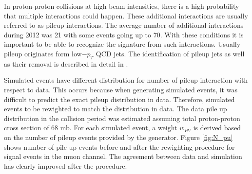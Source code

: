 In proton-proton collisions at high beam intensities, there is a high probability that multiple interactions could happen. These additional interactions are usually referred to as pileup interactions. The average number of additional interactions during 2012 was 21 with some events going up to 70. With these conditions it is important to be able to recognize the signature from such interactions. Usually pileup originates form low$-p_T$ QCD jets. The identification of pileup jets as well as their removal is described in detail in \cite{CMS:2013wea}. 
\par Simulated events have different distribution for number of pileup interaction with respect to data. This occurs because when generating simulated events, it was difficult to predict the exact pileup distribution in data. Therefore, simulated events to be rewighted to match the distribution in data. The data pile up distribution in the collision period was estimated assuming total proton-proton cross section of 68 mb. For each simulated event, a weight $w_{PU}$ is derived based on the number of pileup events provided by the generator. Figure \ref{fig:N_pu} shows number of pile-up events before and after the rewighting procedure for signal events in the muon channel. The agreement between data and simulation has clearly improved after the procedure. 


